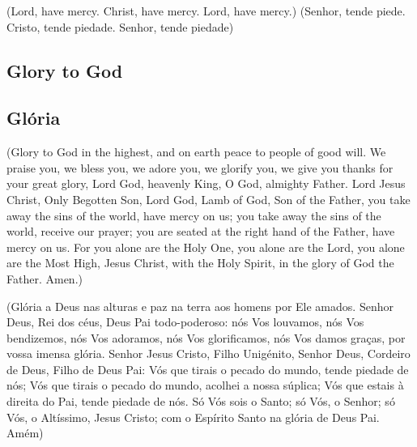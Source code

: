 \documentclass[10pt,a4]{article}
\newcommand \subsect[2] {\subsection*{#1} \switchcolumn \subsection*{#2} \switchcolumn*}
\begin{document}
\begin{paracol}{2}

(Lord, have mercy. Christ, have mercy. Lord, have mercy.)
\switchcolumn
(Senhor, tende piede. Cristo, tende piedade. Senhor, tende piedade)

\switchcolumn*

\subsect{Glory to God}{Gl\'oria}

(Glory to God in the highest,
and on earth peace to people
of good will.
We praise you, we bless you,
we adore you, we glorify you,
we give you thanks for your great
glory,
Lord God, heavenly King, O God,
almighty Father.
Lord Jesus Christ, Only Begotten Son,
Lord God, Lamb of God, Son of the
Father,
you take away the sins of the world,
have mercy on us;
you take away the sins of the world,
receive our prayer;
you are seated at the right hand
of the Father, have mercy on us.
For you alone are the Holy One,
you alone are the Lord,
you alone are the Most High,
Jesus Christ, with the Holy Spirit,
in the glory of God the Father. Amen.)

\switchcolumn

(Gl\'oria a Deus nas alturas e paz na terra aos homens por Ele amados.
 Senhor Deus, Rei dos c\'eus, Deus Pai todo-poderoso:
 n\'os Vos louvamos, n\'os Vos bendizemos, n\'os Vos adoramos, n\'os Vos glorificamos,
 n\'os Vos damos graças, por vossa imensa gl\'oria.
 Senhor Jesus Cristo, Filho Unig\'enito, Senhor Deus, Cordeiro de Deus, Filho de Deus Pai:
 V\'os que tirais o pecado do mundo, tende piedade de n\'os;
 V\'os que tirais o pecado do mundo, acolhei a nossa s\'uplica;
 V\'os que estais \`a direita do Pai, tende piedade de n\'os.
 S\'o V\'os sois o Santo;
 s\'o V\'os, o Senhor;
 s\'o V\'os, o Alt\'issimo, Jesus Cristo;
 com o Esp\'irito Santo na gl\'oria de Deus Pai.
 Am\'em)

 \switchcolumn*

\end{paracol}
\end{document}

